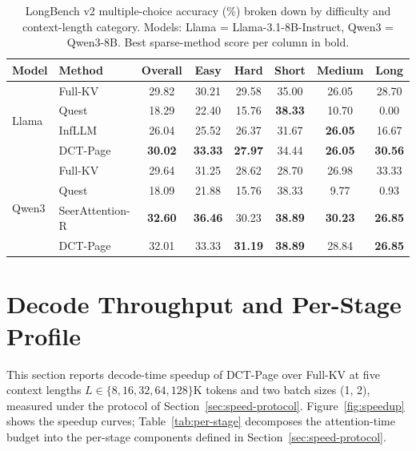 \begin{table}[ht]
  \centering
  \caption[LongBench v2 accuracy.]
  {LongBench v2 multiple-choice accuracy (\%) broken down by
   difficulty and context-length category.  Models:
   Llama = Llama-3.1-8B-Instruct, Qwen3 = Qwen3-8B.  Best
   sparse-method score per column in bold.}
  \label{tab:longbench-v2}
  \centering
  \footnotesize
  \setlength{\tabcolsep}{5pt}
  \begin{tabular}{l l c c c c c c}
    \toprule
    Model & Method
      & Overall
      & Easy & Hard
      & Short & Medium & Long \\
    \midrule
    \multirow{4}{*}{Llama}
      & Full-KV  & 29.82 & 30.21 & 29.58 & 35.00 & 26.05 & 28.70 \\
      & Quest    & 18.29 & 22.40 & 15.76 & \textbf{38.33} & 10.70 & 0.00 \\
      & InfLLM   & 26.04 & 25.52 & 26.37 & 31.67 & \textbf{26.05} & 16.67 \\
      & DCT-Page & \textbf{30.02} & \textbf{33.33} & \textbf{27.97} & 34.44 & \textbf{26.05} & \textbf{30.56} \\
    \midrule
    \multirow{4}{*}{Qwen3}
      & Full-KV         & 29.64 & 31.25 & 28.62 & 28.70 & 26.98 & 33.33 \\
      & Quest           & 18.09 & 21.88 & 15.76 & 38.33 & 9.77 & 0.93 \\
      & SeerAttention-R & \textbf{32.60} & \textbf{36.46} & 30.23 & \textbf{38.89} & \textbf{30.23} & \textbf{26.85} \\
      & DCT-Page        & 32.01 & 33.33 & \textbf{31.19} & \textbf{38.89} & 28.84 & \textbf{26.85} \\
    \bottomrule
  \end{tabular}
\end{table}


\section{Decode Throughput and Per-Stage Profile}\label{sec:results-speed}

This section reports decode-time speedup of DCT-Page over Full-KV at
five context lengths $L \in \{8, 16, 32, 64, 128\}\text{K}$ tokens and
two batch sizes (1, 2), measured under the protocol of
Section~\ref{sec:speed-protocol}.
Figure~\ref{fig:speedup} shows the speedup curves;
Table~\ref{tab:per-stage} decomposes the attention-time budget into
the per-stage components defined in Section~\ref{sec:speed-protocol}.


